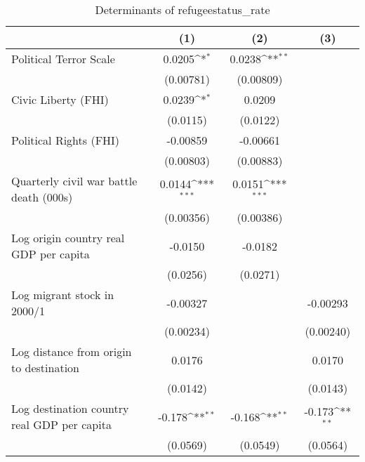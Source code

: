 \begin{table}[htbp]\centering
\def\sym#1{\ifmmode^{#1}\else\(^{#1}\)\fi}
\caption{Determinants of refugeestatus\_rate}
\begin{tabular}{l*{3}{c}}
\hline\hline
                    &\multicolumn{1}{c}{(1)}         &\multicolumn{1}{c}{(2)}         &\multicolumn{1}{c}{(3)}         \\
\hline
Political Terror Scale&      0.0205\sym{*}  &      0.0238\sym{**} &                     \\
                    &   (0.00781)         &   (0.00809)         &                     \\
[1em]
Civic Liberty (FHI) &      0.0239\sym{*}  &      0.0209         &                     \\
                    &    (0.0115)         &    (0.0122)         &                     \\
[1em]
Political Rights (FHI)&    -0.00859         &    -0.00661         &                     \\
                    &   (0.00803)         &   (0.00883)         &                     \\
[1em]
Quarterly civil war battle death (000s)&      0.0144\sym{***}&      0.0151\sym{***}&                     \\
                    &   (0.00356)         &   (0.00386)         &                     \\
[1em]
Log origin country real GDP per capita&     -0.0150         &     -0.0182         &                     \\
                    &    (0.0256)         &    (0.0271)         &                     \\
[1em]
Log migrant stock in 2000/1&    -0.00327         &                     &    -0.00293         \\
                    &   (0.00234)         &                     &   (0.00240)         \\
[1em]
Log distance from origin to destination&      0.0176         &                     &      0.0170         \\
                    &    (0.0142)         &                     &    (0.0143)         \\
[1em]
Log destination country real GDP per capita&      -0.178\sym{**} &      -0.168\sym{**} &      -0.173\sym{**} \\
                    &    (0.0569)         &    (0.0549)         &    (0.0564)         \\

\end{tabular}
\end{table}
